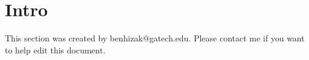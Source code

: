 \documentclass[crop=false]{standalone}
\begin{document}
\section{Intro}
This section was created by benhizak@gatech.edu. Please contact me if you want to help edit this document.
\end{document}
